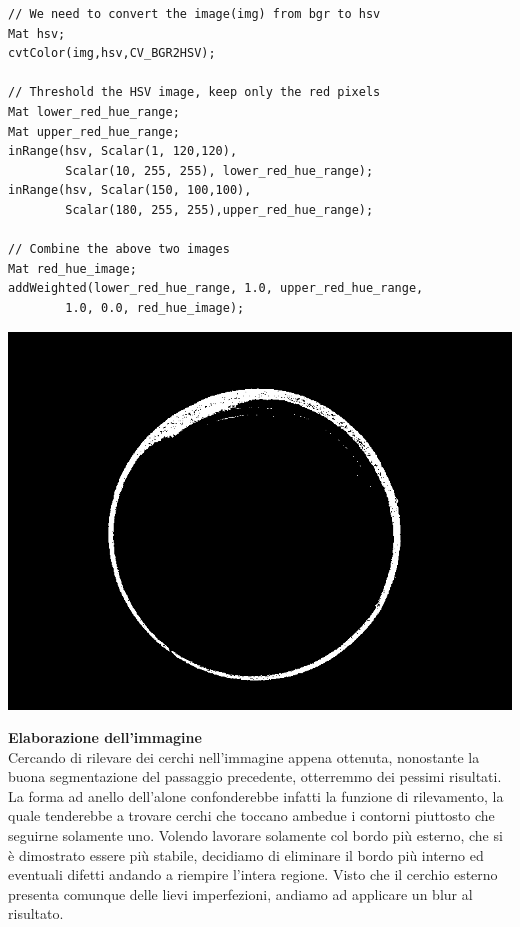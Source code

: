 \begin{lstlisting}
// We need to convert the image(img) from bgr to hsv 
Mat hsv;
cvtColor(img,hsv,CV_BGR2HSV);

// Threshold the HSV image, keep only the red pixels
Mat lower_red_hue_range;
Mat upper_red_hue_range;
inRange(hsv, Scalar(1, 120,120), 
		Scalar(10, 255, 255), lower_red_hue_range);
inRange(hsv, Scalar(150, 100,100), 
		Scalar(180, 255, 255),upper_red_hue_range);

// Combine the above two images
Mat red_hue_image;
addWeighted(lower_red_hue_range, 1.0, upper_red_hue_range, 
		1.0, 0.0, red_hue_image);
\end{lstlisting}
 
\vspace{1cm}

\begin{centering}
\includegraphics[width=\textwidth]{img/bin1.png}
\end{centering}

\newpage

\noindent
\textbf{Elaborazione dell’immagine}
\\ 
Cercando di rilevare dei cerchi nell'immagine appena ottenuta, nonostante la buona segmentazione del passaggio precedente, otterremmo dei pessimi risultati. La forma ad anello dell’alone confonderebbe infatti la funzione di rilevamento, la quale tenderebbe a trovare cerchi che toccano ambedue i contorni piuttosto che seguirne solamente uno. Volendo lavorare solamente col bordo più esterno, che si è dimostrato essere più stabile, decidiamo di eliminare il bordo più interno ed eventuali difetti andando a riempire l'intera regione. 
Visto che il cerchio esterno presenta comunque delle lievi imperfezioni, andiamo ad applicare un blur al risultato.

